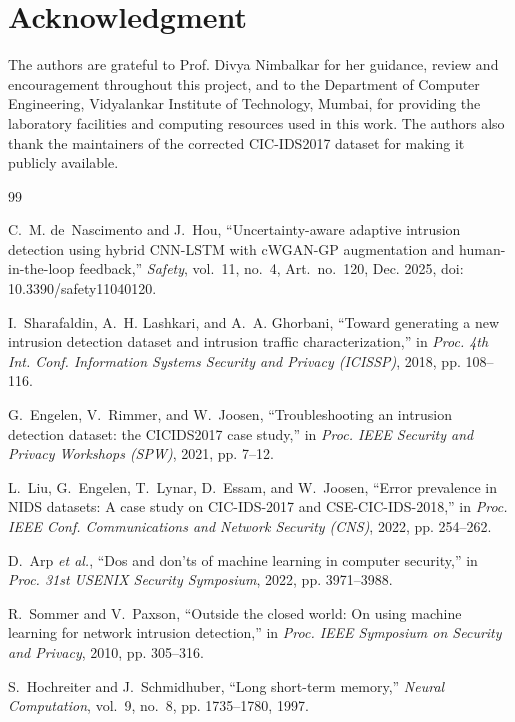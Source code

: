 \documentclass[conference]{IEEEtran}
\begin{document}
\section*{Acknowledgment}
The authors are grateful to Prof. Divya Nimbalkar for her guidance, review and encouragement
throughout this project, and to the Department of Computer Engineering, Vidyalankar Institute of
Technology, Mumbai, for providing the laboratory facilities and computing resources used in this
work. The authors also thank the maintainers of the corrected CIC-IDS2017 dataset for making it publicly
available.

\begin{thebibliography}{99}

C.~M. de~Nascimento and J.~Hou, ``Uncertainty-aware adaptive intrusion detection using hybrid CNN-LSTM with cWGAN-GP augmentation and human-in-the-loop feedback,'' \textit{Safety}, vol.~11, no.~4, Art.~no.~120, Dec. 2025, doi: 10.3390/safety11040120.

I.~Sharafaldin, A.~H. Lashkari, and A.~A. Ghorbani, ``Toward generating a new intrusion detection dataset and intrusion traffic characterization,'' in \textit{Proc. 4th Int. Conf. Information Systems Security and Privacy (ICISSP)}, 2018, pp. 108--116.

G.~Engelen, V.~Rimmer, and W.~Joosen, ``Troubleshooting an intrusion detection dataset: the CICIDS2017 case study,'' in \textit{Proc. IEEE Security and Privacy Workshops (SPW)}, 2021, pp. 7--12.

L.~Liu, G.~Engelen, T.~Lynar, D.~Essam, and W.~Joosen, ``Error prevalence in NIDS datasets: A case study on CIC-IDS-2017 and CSE-CIC-IDS-2018,'' in \textit{Proc. IEEE Conf. Communications and Network Security (CNS)}, 2022, pp. 254--262.

D.~Arp \textit{et al.}, ``Dos and don'ts of machine learning in computer security,'' in \textit{Proc. 31st USENIX Security Symposium}, 2022, pp. 3971--3988.

R.~Sommer and V.~Paxson, ``Outside the closed world: On using machine learning for network intrusion detection,'' in \textit{Proc. IEEE Symposium on Security and Privacy}, 2010, pp. 305--316.

S.~Hochreiter and J.~Schmidhuber, ``Long short-term memory,'' \textit{Neural Computation}, vol.~9, no.~8, pp. 1735--1780, 1997.


\end{thebibliography}
\end{document}
